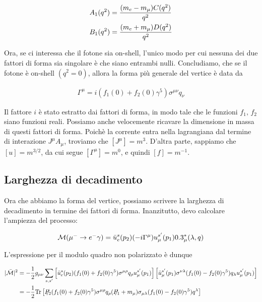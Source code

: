 \documentclass[11pt]{report}
\begin{document}
\begin{align}
    &A_1(q^2) = \frac{(m_e-m_\mu)C(q^2)}{q^2} \notag \\
    &B_1(q^2) = \frac{(m_e + m_\mu)D(q^2)}{q^2}
\end{align}

Ora, se ci interessa che il fotone sia on-shell, l'unico modo per cui nessuna dei due fattori di forma sia singolare è che siano entrambi nulli. Concludiamo, che se il fotone è on-shell \((q^2 = 0)\), allora la forma più generale del vertice è data da  

\begin{align}
    \Gamma^\mu = i(f_1(0) + f_2(0)\gamma^5)\sigma^{\mu\nu}q_\nu 
\end{align}

Il fattore \(i\) è stato estratto dai fattori di forma, in modo tale che le funzioni \(f_1, \, f_2\) siano funzioni reali. Possiamo anche velocemente ricavare la dimensione in massa di questi fattori di forma. Poichè la corrente entra nella lagrangiana dal termine di interazione \(J^\mu A_\mu\), troviamo che \([J^\mu] = m^3\). D'altra parte, sappiamo che \([u] = m^{3/2}\), da cui segue \([\Gamma^\mu] = m^0\), e quindi \([f] = m^{-1}\). 

\subsection{Larghezza di decadimento}

Ora che abbiamo la forma del vertice, possiamo scrivere la larghezza di decadimento in termine dei fattori di forma. Inanzitutto, devo calcolare l'ampiezza del processo: 

\begin{align}
    \mathcal{M}(\mu^- \to e^-\gamma) = \bar{u}^s_e(p_2)(-i\Gamma^\mu)u^{s'}_\mu(p_1)0.3^*_\mu(\lambda, q)
\end{align}

L'espressione per il modulo quadro non polarizzato è dunque 

\begin{align}
    |\mathcal{\bar{M}}|^2 &= -\frac{1}{2}g_{\mu\nu}\sum_{s, s'} \left[\bar{u}_e^s (p_2)(f_1(0) + f_2(0)\gamma^5)\sigma^{\mu\rho}q_\rho u_\mu^{s'}(p_1) \right]\left[\bar{u}_\mu^{s'} (p_1) \sigma^{\nu\lambda} (f_1(0) - f_2(0)\gamma^5)q_\lambda u_\mu^{s'}(p_1) \right] \notag \\ 
    &= -\frac{1}{2}\text{Tr}\left[\slashed{P_2}(f_1(0) + f_2(0)\gamma^5)\sigma^{\mu\rho}q_\rho(\slashed{P_1} +m_\mu)\sigma_{\mu\lambda} (f_1(0) - f_2(0)\gamma^5)q^\lambda\right]
\end{align}
\end{document}
